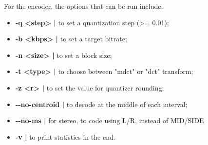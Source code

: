 For the encoder, the options that can be run include:

\begin{itemize}

    \item \textbf{-q <step> | } to set a quantization step (>= 0.01);
    
    \item \textbf{-b <kbps> | } to set a target bitrate;
    
    \item \textbf{-n <size> | } to set a block size;
    
    \item \textbf{-t <type> | } to choose between "mdct" or "dct" transform;
    
    \item \textbf{-z <r> | } to set the value for quantizer rounding;
    
    \item \textbf{-{}-no-centroid | } to decode at the middle of each interval;

    \item \textbf{-{}-no-ms | } for stereo, to code using L/R, instead of MID/SIDE
    
    \item \textbf{-v | } to print statistics in the end.

\end{itemize}